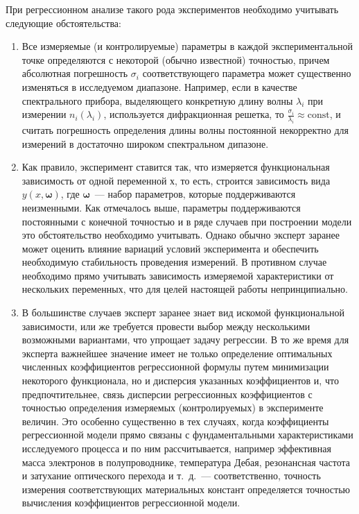 \documentclass[11pt,a4paper]{article}
\theoremstyle{definition}
\begin{document}
При регрессионном анализе такого рода экспериментов необходимо
учитывать следующие обстоятельства:
\begin{enumerate}
  \item Все измеряемые (и контролируемые) параметры в каждой
	экспериментальной точке определяются с некоторой (обычно известной) 
	точностью, причем абсолютная погрешность $\sigma_i$ соответствующего параметра может
	существенно изменяться в исследуемом диапазоне. Например, если в качестве
	спектрального прибора, выделяющего конкретную длину волны $\lambda_i$ при
	измерении $n_i(\lambda_i)$, используется дифракционная решетка, то
	$\frac{\sigma_i}{\lambda_i} \approx \text{const}$, и
	считать погрешность определения длины волны постоянной некорректно для
	измерений в достаточно широком спектральном дипазоне.
  \item Как правило, эксперимент ставится так, что измеряется функциональная
	зависимость от одной переменной $х$, то есть, строится зависимость вида $y(x,
	\boldsymbol{\omega})$, где $\boldsymbol{\omega}$~--- набор параметров,
	которые поддерживаются неизменными. Как
	отмечалось выше, параметры поддерживаются постоянными с конечной
	точностью и в ряде случаев при построении модели это обстоятельство 
	необходимо учитывать. Однако обычно эксперт заранее может оценить
	влияние вариаций условий эксперимента и обеспечить необходимую
	стабильность проведения измерений. В противном случае необходимо прямо
	учитывать зависимость измеряемой характеристики от нескольких
	переменных, что для целей настоящей работы непринципиально.
  \item В большинстве случаев эксперт заранее знает вид
	искомой функциональной зависимости, или же требуется провести выбор
	между несколькими возможными вариантами, что упрощает задачу регрессии.
	В то же время для эксперта важнейшее значение имеет не только
	определение оптимальных численных коэффициентов регрессионной
	формулы путем минимизации некоторого функционала, но и дисперсия
	указанных коэффициентов и, что предпочтительнее, связь дисперсии
	регрессионных коэффициентов с точностью определения измеряемых
	(контролируемых) в эксперименте величин. Это особенно существенно в тех
	случаях, когда коэффициенты регрессионной модели прямо связаны с
	фундаментальными характеристиками исследуемого процесса и по ним
	рассчитывается, например эффективная масса электронов в полупроводнике,
	температура Дебая, резонансная частота и затухание оптического перехода и
	т.~д.~--- соответственно, точность измерения соответствующих материальных
	констант определяется точностью вычисления коэффициентов регрессионной
	модели.
\end{enumerate}
\end{document}
